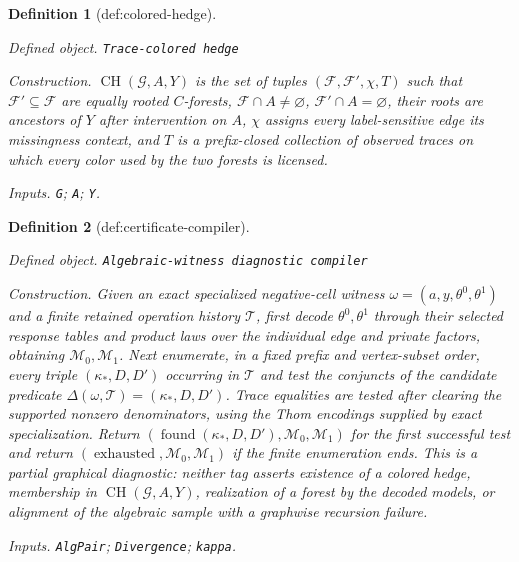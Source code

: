 \documentclass{article}
\newtheorem{definition}{Definition}
\begin{document}
\begin{definition}[def:colored-hedge]\label{def:colored-hedge}
\par\smallskip\noindent\emph{Defined object.} \texttt{Trace-\allowbreak{}colored hedge}
\par\smallskip\noindent\emph{Construction.} \(\operatorname{CH}(\mathcal G,A,Y)\) is the set of tuples \((\mathcal F,\mathcal F',\chi,T)\) such that \(\mathcal F'\subseteq\mathcal F\) are equally rooted \(C\)-forests, \(\mathcal F\cap A\neq\varnothing\), \(\mathcal F'\cap A=\varnothing\), their roots are ancestors of \(Y\) after intervention on \(A\), \(\chi\) assigns every label-sensitive edge its missingness context, and \(T\) is a prefix-closed collection of observed traces on which every color used by the two forests is licensed.
\par\smallskip\noindent\emph{Inputs.} \texttt{G}; \texttt{A}; \texttt{Y}.
\end{definition}

\begin{definition}[def:certificate-compiler]\label{def:certificate-compiler}
\par\smallskip\noindent\emph{Defined object.} \texttt{Algebraic-\allowbreak{}witness diagnostic compiler}
\par\smallskip\noindent\emph{Construction.} Given an exact specialized negative-cell witness \(\omega=(a,y,\theta^0,\theta^1)\) and a finite retained operation history \(\mathcal T\), first decode \(\theta^0,\theta^1\) through their selected response tables and product laws over the individual edge and private factors, obtaining \(\mathcal M_0,\mathcal M_1\). Next enumerate, in a fixed prefix and vertex-subset order, every triple \((\kappa_*,D,D')\) occurring in \(\mathcal T\) and test the conjuncts of the candidate predicate \(\Delta(\omega,\mathcal T)=(\kappa_*,D,D')\). Trace equalities are tested after clearing the supported nonzero denominators, using the Thom encodings supplied by exact specialization. Return \((\operatorname{found}(\kappa_*,D,D'),\mathcal M_0,\mathcal M_1)\) for the first successful test and return \((\operatorname{exhausted},\mathcal M_0,\mathcal M_1)\) if the finite enumeration ends. This is a partial graphical diagnostic: neither tag asserts existence of a colored hedge, membership in \(\operatorname{CH}(\mathcal G,A,Y)\), realization of a forest by the decoded models, or alignment of the algebraic sample with a graphwise recursion failure.
\par\smallskip\noindent\emph{Inputs.} \texttt{AlgPair}; \texttt{Divergence}; \texttt{kappa}.
\end{definition}
\end{document}
